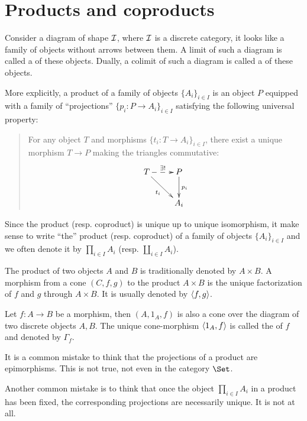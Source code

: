 \newpage\section{Products and coproducts}
\begin{defn}\label{def:product}
  Consider a diagram of shape ${\cal I}$, where ${\cal I}$ is a discrete category, it looks like a family of objects without arrows between them. A limit of such a diagram is called a  of these objects. Dually, a colimit of such a diagram is called a  of these objects.

  More explicitly, a product of a family of objects $\{A_i\}_{i\in I}$ is an object $P$ equipped with a family of ``projections'' $\{p_i\colon P\to A_i\}_{i\in I}$ satisfying the following universal property:
  \begin{quote}
    For any object $T$ and morphisms $\{t_i\colon T\to A_i\}_{i\in I}$, there exist a unique morphism $T\to P$ making the triangles commutative:
    \begin{displaymath}
      \xymatrix{
         T\ar@{-->}^{\exists!}[r]\ar[dr]_{t_i}&P\ar[d]^{p_i}\\
         &A_i
      }
    \end{displaymath}
  \end{quote}
\end{defn}
\begin{rem}
  Since the product (resp. coproduct) is unique up to unique isomorphism, it make sense to write ``the'' product (resp. coproduct) of a family of objects $\{A_i\}_{i\in I}$ and we often denote it by $\prod_{i\in I} A_i$ (resp. $\coprod_{i\in I} A_i$). 
\end{rem}
\begin{rem}
  The product of two objects $A$ and $B$ is traditionally denoted by $A\times B$. A morphism from a cone $(C,f,g)$ to the product $A\times B$ is the unique factorization of $f$ and $g$ through $A\times B$. It is usually denoted by $\langle f,g\rangle$.
\end{rem}
\begin{exam}
  Let $f\colon A\to B$ be a morphism, then $(A,1_A,f)$ is also a cone over the diagram of two discrete objects $A, B$. The unique cone-morphism $\langle1_A,f\rangle$ is called the  of $f$ and denoted by $\Gamma_f$.
\end{exam}
\begin{rem}
  It is a common mistake to think that the projections of a product are epimorphisms. This is not true, not even in the category $\Set$.

  Another common mistake is to think that once the object $\prod_{i\in I} A_i$ in a product has been fixed, the corresponding projections are necessarily unique. It is not at all.
\end{rem}

